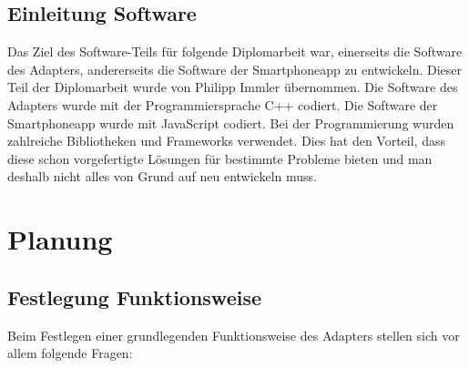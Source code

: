 \documentclass[11pt, twoside]{article}
\begin{document}
\subsection{Einleitung Software}
Das Ziel des Software-Teils für folgende Diplomarbeit war, einerseits die Software des Adapters, andererseits die Software der Smartphoneapp zu entwickeln. Dieser Teil der Diplomarbeit wurde von Philipp Immler übernommen. Die Software des Adapters wurde mit der Programmiersprache C++ codiert. Die Software der Smartphoneapp wurde mit JavaScript codiert. Bei der Programmierung wurden zahlreiche Bibliotheken und Frameworks verwendet. Dies hat den Vorteil, dass diese schon vorgefertigte Lösungen für bestimmte Probleme bieten und man deshalb nicht alles von Grund auf neu entwickeln muss. 

\section{Planung}
\subsection{Festlegung Funktionsweise}
Beim Festlegen einer grundlegenden Funktionsweise des Adapters stellen sich vor allem folgende Fragen:
\end{document}
